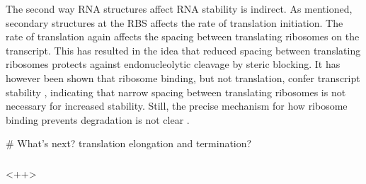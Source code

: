The second way RNA structures affect RNA stability is indirect. As mentioned,
secondary structures at the RBS affects the rate of translation initiation. The
rate of translation again affects the spacing between translating ribosomes on
the transcript. This has resulted in the idea that reduced spacing between
translating ribosomes protects against endonucleolytic cleavage by steric
blocking. It has however been shown that ribosome binding, but not translation,
confer transcript stability \cite{wagner_efficient_1994}
\cite{hambraeus_5_2002}, indicating that narrow spacing between translating
ribosomes is not necessary for increased stability. Still, the precise
mechanism for how ribosome binding prevents degradation is not clear
\cite{deana_lost_2005}.

# What's next? translation elongation and termination?
\subsubsection{}<++>

